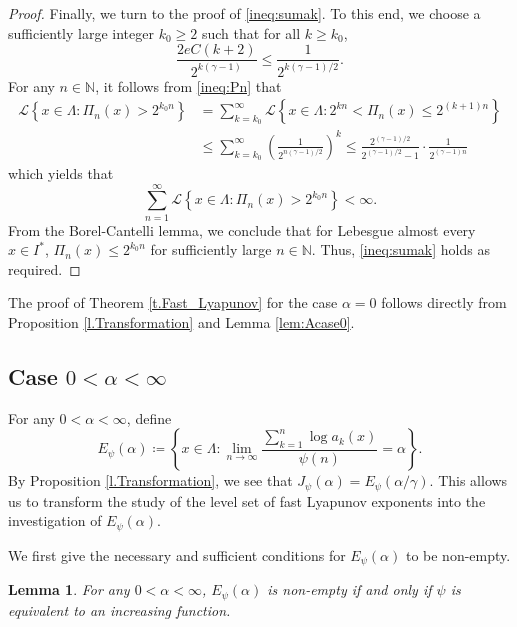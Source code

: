 \documentclass[12pt,reqno]{amsart}
\renewcommand{\=}{\coloneqq}
\theoremstyle{plain}
\newtheorem{lemma}[theorem]{Lemma}
\begin{document}
\begin{proof}
Finally, we turn to the proof of \eqref{ineq:sumak}. To this end, we choose a sufficiently large integer $k_0\geq 2$ such that for all $k \geq k_0$,
$$
\frac{2e C(k+2)}{2^{k(\gamma-1)}} \leq \frac{1}{2^{k(\gamma-1)/2}}.
$$
For any $n \in \mathbb N$, it follows from \eqref{ineq:Pn} that
\begin{align*}
\mathcal{L}\left\{x\in \Lambda:  \Pi_{n}(x) >2^{k_0n}\right\} &= \sum^\infty_{k=k_0} \mathcal{L}\left\{x\in \Lambda: 2^{kn}< \Pi_{n}(x) \leq 2^{(k+1)n}\right\}\\
&\leq \sum^\infty_{k=k_0} \left(\frac{1}{2^{n(\gamma-1)/2}}\right)^k \leq \frac{2^{(\gamma-1)/2}}{2^{(\gamma-1)/2}-1}\cdot \frac{1}{2^{(\gamma-1)n}}
\end{align*}
which yields that
$$
\sum^\infty_{n=1} \mathcal{L}\left\{x\in \Lambda:  \Pi_{n}(x) >2^{k_0n}\right\} <\infty.
$$
From the Borel-Cantelli lemma, we conclude that for Lebesgue almost every $x\in I^*$, $\Pi_{n}(x) \leq 2^{k_0n}$ for sufficiently large $n \in \mathbb N$. Thus, \eqref{ineq:sumak} holds as required.
\end{proof}

The proof of Theorem \ref{t.Fast_Lyapunov} for the case $\alpha =0$ follows directly from Proposition \ref{l.Transformation} and Lemma \ref{lem:Acase0}.

\subsection{Case $0<\alpha< \infty$}
For any $0<\alpha< \infty$, define
\begin{equation}\label{e.def_E_psi_alpha}
        E_{\psi}(\alpha)\coloneqq
        \left\{x\in \Lambda:\lim_{n \to \infty}
        \frac{\sum_{k=1}^n \log a_{k}(x)}{\psi(n)}= \alpha \right\}.
\end{equation}
By Proposition \ref{l.Transformation}, we see that $J_\psi(\alpha) =E_\psi(\alpha/\gamma)$. This allows us to transform the study of the level set of fast Lyapunov exponents into the investigation of $E_{\psi}(\alpha)$.

We first give the necessary and sufficient conditions for $E_{\psi}(\alpha)$ to be non-empty.

\begin{lemma}\label{l.equivalent_increasing}
For any $0<\alpha < \infty$, $E_{\psi}(\alpha)$ is non-empty if and only if $\psi$ is equivalent to an increasing function.
\end{lemma}
\end{document}
